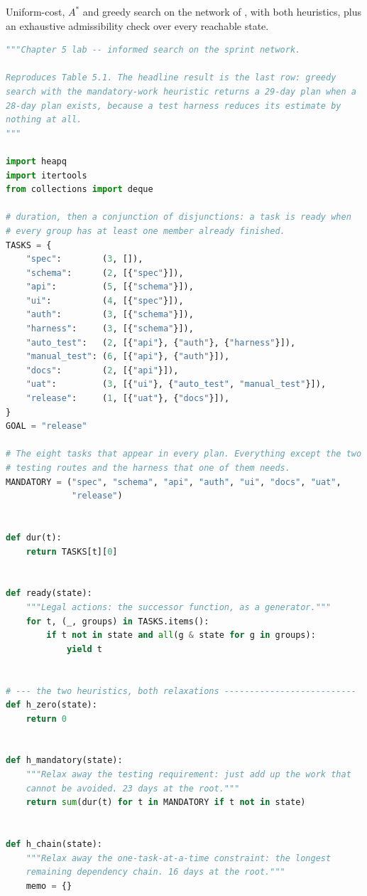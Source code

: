 \begin{lab}
Uniform-cost, $A^{*}$ and greedy search on the network of , with
both heuristics, plus an exhaustive admissibility check over every reachable state.
\begin{lstlisting}[language=Python]
"""Chapter 5 lab -- informed search on the sprint network.

Reproduces Table 5.1. The headline result is the last row: greedy
search with the mandatory-work heuristic returns a 29-day plan when a
28-day plan exists, because a test harness reduces its estimate by
nothing at all.
"""

import heapq
import itertools
from collections import deque

# duration, then a conjunction of disjunctions: a task is ready when
# every group has at least one member already finished.
TASKS = {
    "spec":        (3, []),
    "schema":      (2, [{"spec"}]),
    "api":         (5, [{"schema"}]),
    "ui":          (4, [{"spec"}]),
    "auth":        (3, [{"schema"}]),
    "harness":     (3, [{"schema"}]),
    "auto_test":   (2, [{"api"}, {"auth"}, {"harness"}]),
    "manual_test": (6, [{"api"}, {"auth"}]),
    "docs":        (2, [{"api"}]),
    "uat":         (3, [{"ui"}, {"auto_test", "manual_test"}]),
    "release":     (1, [{"uat"}, {"docs"}]),
}
GOAL = "release"

# The eight tasks that appear in every plan. Everything except the two
# testing routes and the harness that one of them needs.
MANDATORY = ("spec", "schema", "api", "auth", "ui", "docs", "uat",
             "release")


def dur(t):
    return TASKS[t][0]


def ready(state):
    """Legal actions: the successor function, as a generator."""
    for t, (_, groups) in TASKS.items():
        if t not in state and all(g & state for g in groups):
            yield t


# --- the two heuristics, both relaxations --------------------------
def h_zero(state):
    return 0


def h_mandatory(state):
    """Relax away the testing requirement: just add up the work that
    cannot be avoided. 23 days at the root."""
    return sum(dur(t) for t in MANDATORY if t not in state)


def h_chain(state):
    """Relax away the one-task-at-a-time constraint: the longest
    remaining dependency chain. 16 days at the root."""
    memo = {}


\end{lstlisting}
\end{lab}
